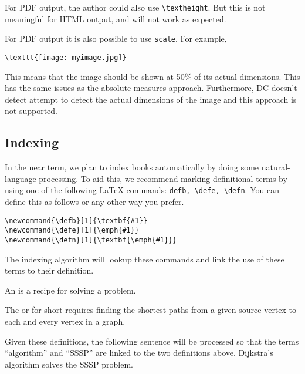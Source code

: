 \begin{note}
For PDF output, the author could also use \lstinline`\textheight`.
%
But this is not meaningful for HTML output, and will not work as expected.
\end{note}

\begin{important}
For PDF output it is also possible to use \lstinline'scale'.  For example,
\begin{lstlisting}
\texttt{[image: myimage.jpg]}
\end{lstlisting}

This means that the image should be shown at 50\% of its actual dimensions.  This has  the same issues as the absolute measures approach. Furthermore, DC doesn't detect attempt to detect the actual dimensions of the image and this approach is not supported.
\end{important}

\subsection{Indexing}

\begin{group}
In the near term, we plan to index books automatically by doing some natural-language processing.  
%
To aid this, we recommend marking definitional terms by using one of the following LaTeX commands: \lstinline`defb, \defe, \defn`.  You can define this as follows or any other way you prefer.
%
\begin{lstlisting}
\newcommand{\defb}[1]{\textbf{#1}}
\newcommand{\defe}[1]{\emph{#1}}
\newcommand{\defn}[1]{\textbf{\emph{#1}}}
\end{lstlisting}
%
The indexing algorithm will lookup these commands and link the use of these terms to their definition.

\begin{example}
\begin{definition}[Algorithm]
\label{def:algorithm}
An  is a recipe for solving a problem.
\end{definition}


\begin{definition}
\label{def:sssp}
The  or  for short requires finding  the shortest paths from a given source vertex to each and every vertex in a graph. 
\end{definition}

Given these definitions, the following sentence will be processed so that the terms ``algorithm'' and ``SSSP'' are linked to the two definitions above.
%
Dijkstra's algorithm solves the SSSP problem.
\end{example}
\end{group}


